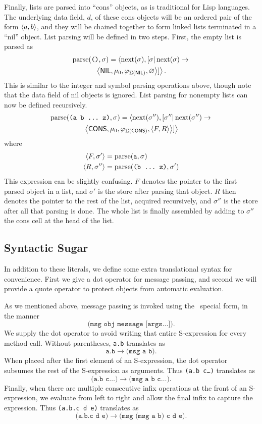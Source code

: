 \documentclass[twocolumn]{article}
\begin{document}
Finally, lists are parsed into ``cons'' objects, as is traditional for
Lisp languages. The underlying data field, $d$, of these cons objects
will be an ordered pair of the form $\left< a,b\right>$, and they will be
chained together to form linked lists terminated in a ``nil''
object. List parsing will be defined in two steps. First, the empty
list is parsed as
\begin{multline*}
  \operatorname{parse}(\texttt{()},\sigma) = \left<\operatorname{next}(\sigma),
  [\sigma|\operatorname{next}(\sigma) \rightarrow \right.\\
\left.\left<\mathsf{NIL}, \mu_0, \varphi_{\Sigma(\mathsf{NIL})}, \varnothing\right>]\right>.
\end{multline*}
This is similar to the integer and symbol parsing operations above,
though note that the data field of nil objects is ignored. List
parsing for nonempty lists can now be defined recursively.
\begin{multline*} \operatorname{parse}(\texttt{(a b \ldots\ z)},\sigma) = \left<
  \operatorname{next}(\sigma''),[\sigma''|\operatorname{next}(\sigma'')
  \rightarrow\right. \\\left.\left<\mathsf{CONS}, \mu_0,
  \varphi_{\Sigma(\mathsf{CONS})},
  \left< F, R \right> \right> ] \right>
\end{multline*}
where
\begin{align*}
  \left< F, \sigma' \right> &= \operatorname{parse}( \texttt{a}, \sigma ) \\
  \left< R, \sigma'' \right> &= \operatorname{parse}( \texttt{(b \ldots\ z)}, \sigma')
\end{align*}
This expression can be slightly confusing. $F$ denotes the pointer to
the first parsed object in a list, and $\sigma'$ is the store after
parsing that object. $R$ then denotes the pointer to the rest of the
list, acquired recursively, and $\sigma''$ is the store after all that
parsing is done. The whole list is finally assembled by adding to
$\sigma''$ the cons cell at the head of the list.

\subsection*{Syntactic Sugar}
In addition to these literals, we define some extra translational
syntax for convenience. First we give a dot operator for message
passing, and second we will provide a quote operator to protect
objects from automatic evaluation.

As we mentioned above, message passing is invoked using the \msg\
special form, in the manner
\[\texttt{(msg obj message [args...])}.\]
We supply the dot operator to avoid writing that entire
S-expression for every method call. Without parentheses, \texttt{a.b}
translates as
\[\texttt{a.b}\rightarrow\texttt{(msg a b)}.\]
When placed after the first element of an S-expression, the dot
operator subsumes the rest of the S-expression as arguments. Thus
\texttt{(a.b c\ldots)}  translates as
\[\texttt{(a.b c\ldots)} \rightarrow \texttt{(msg a b c\ldots)}.\]
Finally, when there are multiple consecutive infix operations at the
front of an S-expression, we evaluate from left to right and allow the
final infix to capture the expression. Thus \texttt{(a.b.c d e)}
translates as
\[ \texttt{(a.b.c d e)} \rightarrow \texttt{(msg (msg a b) c d e)}.\]
\end{document}
